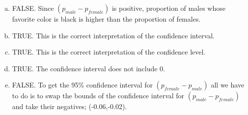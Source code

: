 {{\begin{enumerate}[(a)]
\end{enumerate}
}
{
\begin{enumerate}[(a)]
\item FALSE. Since $(p_{male} - p_{female})$ is positive, proportion of males whose favorite color is black is higher than the proportion of females.
\item TRUE. This is the correct interpretation of the confidence interval.
\item TRUE. This is the correct interpretation of the confidence level.
\item TRUE. The confidence interval does not include 0.
\item FALSE. To get the 95\% confidence interval for $(p_{female} - p_{male})$ all we have to do is to swap the bounds of the confidence interval for $(p_{male} - p_{female})$ and take their negatives; (-0.06,-0.02).
\end{enumerate}
}
}

%

